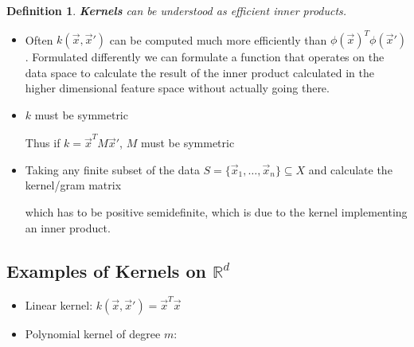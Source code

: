 \documentclass[8pt,a4paper]{scrartcl}
\newtheorem{define}{Definition}
\begin{document}
\begin{multicols*}{3}
\begin{define}
\textbf{Kernels} can be understood as \emph{efficient} inner products.

\end{define}

\begin{itemize}
\ncompaq
\item Often $k(\vec{x},\vec{x}')$ can be computed much more efficiently than $\phi(\vec{x})^T\phi(\vec{x}')$. Formulated differently we can formulate a function that operates on the data space to calculate the result of the inner product calculated in the higher dimensional feature space without actually going there.
\item $k$ must be symmetric

Thus if $k=\vec{x}^TM\vec{x}'$, $M$ must be symmetric
\item Taking any finite subset of the data $S=\{\vec{x}_1,\ldots,\vec{x}_n\}\subseteq X$ and calculate the kernel/gram matrix


which has to be positive semidefinite, which is due to the kernel implementing an inner product.
\end{itemize}


\subsection{Examples of Kernels on $\mathbb{R}^d$}

\begin{itemize}
\ncompaq
\item Linear kernel: $k(\vec{x},\vec{x}') = \vec{x}^T\vec{x}$
\item Polynomial kernel of degree $m$:


\end{itemize}
\end{multicols*}
\end{document}
